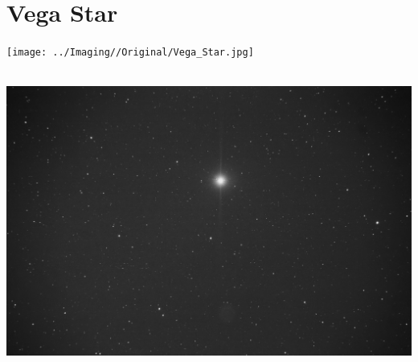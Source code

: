 \ \\\section{Vega Star}
\texttt{[image: ../Imaging//Original/Vega\_Star.jpg]}
{\footnotesize\color{white}


}\ \\
\includegraphics[width=\textwidth]{../Imaging//Grayscale/Vega_Star.jpg}
